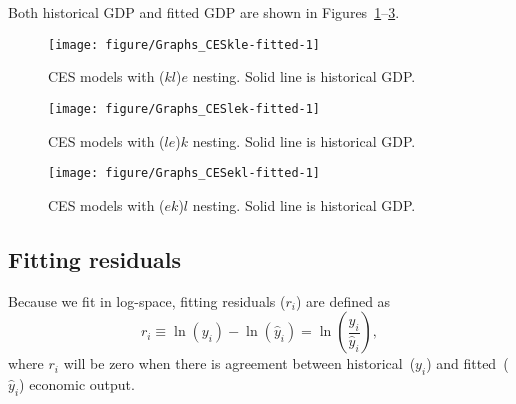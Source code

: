 \documentclass[preprint,authoryear,12pt]{elsarticle}\usepackage[]{graphicx}\usepackage[]{color}
\makeatletter
\def\maxwidth{ %
  \ifdim\Gin@nat@width>\linewidth
    \linewidth
  \else
    \Gin@nat@width
  \fi
}
\newenvironment{knitrout}{}{} %
\makeatother
\begin{document}
Both historical GDP and fitted GDP are shown in 
Figures~\ref{fig:Graphs CESkle-fitted}--\ref{fig:Graphs CESekl-fitted}.
%
\begin{knitrout}
\color{fgcolor}\begin{figure}[H]

{\centering \texttt{[image: figure/Graphs\_CESkle-fitted-1]} 

}

\caption[CES models with (]{CES models with ($kl$)$e$ nesting. Solid line is historical GDP.}\label{fig:Graphs CESkle-fitted}
\end{figure}


\end{knitrout}
%
\begin{knitrout}
\color{fgcolor}\begin{figure}[H]

{\centering \texttt{[image: figure/Graphs\_CESlek-fitted-1]} 

}

\caption[CES models with (]{CES models with ($le$)$k$ nesting. Solid line is historical GDP.}\label{fig:Graphs CESlek-fitted}
\end{figure}


\end{knitrout}
%
\begin{knitrout}
\color{fgcolor}\begin{figure}[H]

{\centering \texttt{[image: figure/Graphs\_CESekl-fitted-1]} 

}

\caption[CES models with (]{CES models with ($ek$)$l$ nesting. Solid line is historical GDP.}\label{fig:Graphs CESekl-fitted}
\end{figure}


\end{knitrout}


\subsection{Fitting residuals} 
\label{sec:fitting_residuals}



Because we fit in log-space, fitting residuals ($r_i$) are defined as
%
\begin{equation} \label{eq:log-residuals}
  r_i \equiv \ln(y_i) - \ln(\hat{y}_i) =\ln\left( \frac{y_i}{\hat{y}_i} \right), 
\end{equation}
%
where $r_i$ will be zero when there is agreement between 
historical~($y_i$) and fitted~($\hat{y}_i$) economic output.
\end{document}

